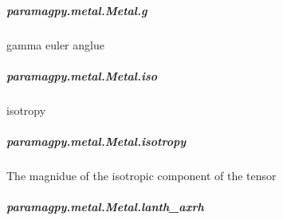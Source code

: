 \documentclass[a4paper,10pt,english]{sphinxmanual}
\begin{document}
\begin{fulllineitems}
\begin{fulllineitems}
\subparagraph{paramagpy.metal.Metal.g}
\label{\detokenize{reference/generated/paramagpy.metal.Metal.g:paramagpy-metal-metal-g}}\label{\detokenize{reference/generated/paramagpy.metal.Metal.g::doc}}

\begin{fulllineitems}
\label{\detokenize{reference/generated/paramagpy.metal.Metal.g:paramagpy.metal.Metal.g}}
gamma euler anglue

\end{fulllineitems}



\subparagraph{paramagpy.metal.Metal.iso}
\label{\detokenize{reference/generated/paramagpy.metal.Metal.iso:paramagpy-metal-metal-iso}}\label{\detokenize{reference/generated/paramagpy.metal.Metal.iso::doc}}

\begin{fulllineitems}
\label{\detokenize{reference/generated/paramagpy.metal.Metal.iso:paramagpy.metal.Metal.iso}}
isotropy

\end{fulllineitems}



\subparagraph{paramagpy.metal.Metal.isotropy}
\label{\detokenize{reference/generated/paramagpy.metal.Metal.isotropy:paramagpy-metal-metal-isotropy}}\label{\detokenize{reference/generated/paramagpy.metal.Metal.isotropy::doc}}

\begin{fulllineitems}
\label{\detokenize{reference/generated/paramagpy.metal.Metal.isotropy:paramagpy.metal.Metal.isotropy}}
The magnidue of the isotropic component of the tensor

\end{fulllineitems}



\subparagraph{paramagpy.metal.Metal.lanth\_axrh}
\label{\detokenize{reference/generated/paramagpy.metal.Metal.lanth_axrh:paramagpy-metal-metal-lanth-axrh}}\label{\detokenize{reference/generated/paramagpy.metal.Metal.lanth_axrh::doc}}


\end{fulllineitems}
\end{fulllineitems}
\end{document}
